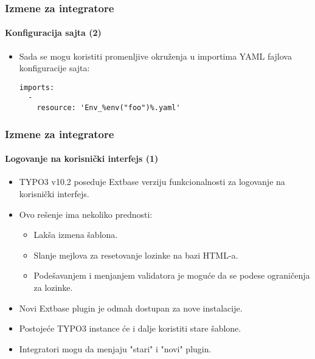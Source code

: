 \begin{frame}[fragile]
	\frametitle{Izmene za integratore}
	\framesubtitle{Konfiguracija sajta (2)}

	\lstset{basicstyle=\tiny\ttfamily}

	\begin{itemize}

		\item Sada se mogu koristiti promenljive okruženja u importima YAML fajlova konfiguracije sajta:
\begin{lstlisting}
imports:
  -
    resource: 'Env_%env("foo")%.yaml'
\end{lstlisting}

	\end{itemize}

\end{frame}


\begin{frame}[fragile]
	\frametitle{Izmene za integratore}
	\framesubtitle{Logovanje na korisnički interfejs (1)}

	\begin{itemize}

		\item TYPO3 v10.2 poseduje Extbase verziju funkcionalnosti za logovanje na korisnički interfejs.
		\item Ovo rešenje ima nekoliko prednosti:

			\begin{itemize}
				\item Lakša izmena šablona.
				\item Slanje mejlova za resetovanje lozinke na bazi HTML-a.
				\item Podešavanjem i menjanjem validatora je moguće da se podese ograničenja za lozinke.
			\end{itemize}

		\item Novi Extbase plugin je odmah dostupan za nove instalacije.
		\item Postojeće TYPO3 instance će i dalje koristiti stare šablone.
		\item Integratori mogu da menjaju "stari" i "novi" plugin.

	\end{itemize}

\end{frame}

